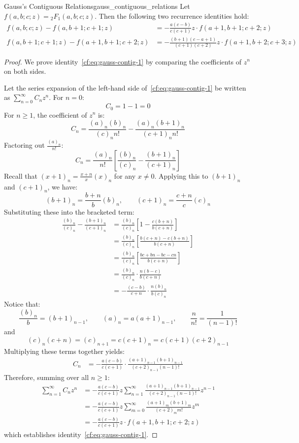 \documentclass[a4paper]{article}
\begin{document}
\begin{mylemma}{Gauss's Contiguous Relations}{gauss_contiguous_relations}
  Let $f(a, b; c; z) = {_2F_1}(a, b; c; z)$. Then the following two recurrence identities hold:
  \begin{align}
    f(a, b; c; z) - f(a, b+1; c+1; z) & = -\frac{a(c-b)}{c(c+1)} z \cdot f(a+1, b+1; c+2; z) \label{cf:eq:gauss-contig-1} \\
    f(a, b+1; c+1; z) - f(a+1, b+1; c+2; z) & = -\frac{(b+1)(c-a+1)}{(c+1)(c+2)} z \cdot f(a+1, b+2; c+3; z) \label{cf:eq:gauss-contig-2}
  \end{align}

  \begin{proof}
    We prove identity~\eqref{cf:eq:gauss-contig-1} by comparing the coefficients of $z^n$ on both sides.
    
    Let the series expansion of the left-hand side of~\eqref{cf:eq:gauss-contig-1} be written as $\sum_{n=0}^\infty C_n z^n$.
    For $n = 0$:
    \[
      C_0 = 1 - 1 = 0
    \]
    For $n \ge 1$, the coefficient of $z^n$ is:
    \[
      C_n = \frac{(a)_n (b)_n}{(c)_n n!} - \frac{(a)_n (b+1)_n}{(c+1)_n n!}
    \]
    Factoring out $\frac{(a)_n}{n!}$:
    \[
      C_n = \frac{(a)_n}{n!} \left[ \frac{(b)_n}{(c)_n} - \frac{(b+1)_n}{(c+1)_n} \right]
    \]
    Recall that $(x+1)_n = \frac{x+n}{x}(x)_n$ for any $x \ne 0$.
    Applying this to $(b+1)_n$ and $(c+1)_n$, we have:
    \[
      (b+1)_n = \frac{b+n}{b} (b)_n, \qquad (c+1)_n = \frac{c+n}{c} (c)_n
    \]
    Substituting these into the bracketed term:
    \begin{align*}
      \frac{(b)_n}{(c)_n} - \frac{(b+1)_n}{(c+1)_n} & = \frac{(b)_n}{(c)_n} \left[ 1 - \frac{c(b+n)}{b(c+n)} \right] \\
      & = \frac{(b)_n}{(c)_n} \left[ \frac{b(c+n) - c(b+n)}{b(c+n)} \right] \\
      & = \frac{(b)_n}{(c)_n} \left[ \frac{bc + bn - bc - cn}{b(c+n)} \right] \\
      & = \frac{(b)_n}{(c)_n} \cdot \frac{n(b-c)}{b(c+n)} \\
      & = -\frac{(c-b)}{c+n} \cdot \frac{n(b)_n}{b(c)_n}
    \end{align*}
    Notice that:
    \[
      \frac{(b)_n}{b} = (b+1)_{n-1}, \qquad (a)_n = a (a+1)_{n-1}, \qquad \frac{n}{n!} = \frac{1}{(n-1)!}
    \]
    and
    \[
      (c)_n (c+n) = (c)_{n+1} = c(c+1)_n = c(c+1)(c+2)_{n-1}
    \]
    Multiplying these terms together yields:
    \begin{align*}
      C_n & = -\frac{a(c-b)}{c(c+1)} \cdot \frac{(a+1)_{n-1} (b+1)_{n-1}}{(c+2)_{n-1} (n-1)!}
    \end{align*}
    Therefore, summing over all $n \ge 1$:
    \begin{align*}
      \sum_{n=1}^\infty C_n z^n & = -\frac{a(c-b)}{c(c+1)} z \sum_{n=1}^\infty \frac{(a+1)_{n-1} (b+1)_{n-1}}{(c+2)_{n-1} (n-1)!} z^{n-1} \\
      & = -\frac{a(c-b)}{c(c+1)} z \sum_{m=0}^\infty \frac{(a+1)_m (b+1)_m}{(c+2)_m m!} z^m \\
      & = -\frac{a(c-b)}{c(c+1)} z \cdot f(a+1, b+1; c+2; z)
    \end{align*}
    which establishes identity~\eqref{cf:eq:gauss-contig-1}.


\end{proof}
\end{mylemma}
\end{document}
